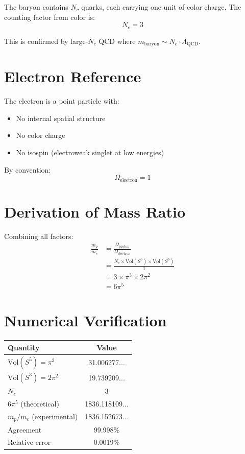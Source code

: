 The baryon contains $N_c$ quarks, each carrying one unit of color charge. The counting factor from color is:
\begin{equation}
N_c = 3
\end{equation}

This is confirmed by large-$N_c$ QCD where $m_{\text{baryon}} \sim N_c \cdot \Lambda_{\text{QCD}}$.

\section{Electron Reference}

The electron is a point particle with:
\begin{itemize}
\item No internal spatial structure
\item No color charge
\item No isospin (electroweak singlet at low energies)
\end{itemize}

By convention:
\begin{equation}
\Omega_{\text{electron}} = 1
\end{equation}

\section{Derivation of Mass Ratio}

Combining all factors:
\begin{align}
\frac{m_p}{m_e} &= \frac{\Omega_{\text{proton}}}{\Omega_{\text{electron}}} \\
&= \frac{N_c \times \text{Vol}(S^5) \times \text{Vol}(S^3)}{1} \\
&= 3 \times \pi^3 \times 2\pi^2 \\
&= 6\pi^5
\end{align}

\section{Numerical Verification}

\begin{center}
\begin{tabular}{lc}
\hline
Quantity & Value \\
\hline
$\text{Vol}(S^5) = \pi^3$ & 31.006277... \\
$\text{Vol}(S^3) = 2\pi^2$ & 19.739209... \\
$N_c$ & 3 \\
\hline
$6\pi^5$ (theoretical) & 1836.118109... \\
$m_p/m_e$ (experimental) & 1836.152673... \\
\hline
Agreement & 99.998\% \\
Relative error & 0.0019\% \\
\hline
\end{tabular}
\end{center}

